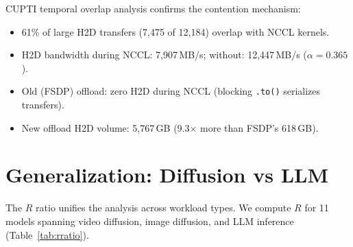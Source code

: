 \documentclass{article}
\begin{document}
CUPTI temporal overlap analysis confirms the contention mechanism:
\begin{itemize}
    \item 61\% of large H2D transfers (7{,}475 of 12{,}184) overlap with NCCL kernels.
    \item H2D bandwidth during NCCL: 7{,}907\,MB/s; without: 12{,}447\,MB/s ($\alpha = 0.365$).
    \item Old (FSDP) offload: zero H2D during NCCL (blocking \texttt{.to()} serializes transfers).
    \item New offload H2D volume: 5{,}767\,GB (9.3$\times$ more than FSDP's 618\,GB).
\end{itemize}

\section{Generalization: Diffusion vs LLM}
\label{sec:generalization}

The $R$ ratio unifies the analysis across workload types. We compute $R$ for 11 models spanning video diffusion, image diffusion, and LLM inference (Table~\ref{tab:rratio}).
\end{document}
